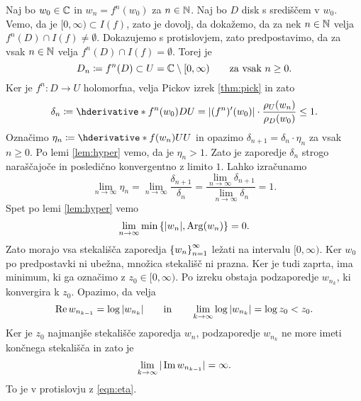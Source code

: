 \begin{dokaz}
    Naj bo \(w_0 \in \mathbb C\) in \(w_n = f^n (w_0)\) za \(n \in \mathbb N\). Naj bo \(D\) disk s središčem v \(w_0\). Vemo, da je \([0, \infty) \subset I (f)\), zato je dovolj, da dokažemo, da za nek \(n \in \mathbb N\) velja \(f^n (D) \cap I (f) \neq \emptyset\). Dokazujemo s protislovjem, zato predpostavimo, da za vsak \(n \in \mathbb N\) velja \(f^n (D) \cap I (f) = \emptyset\). Torej je
    \[D_n \coloneq f^n (D) \subset U = \mathbb C \setminus [0, \infty) \qquad \text{za vsak } n \geq 0.\]
    Ker je \(f^n \colon D \to U\) holomorfna, velja Pickov izrek \ref{thm:pick} in zato
    \[\delta_n \coloneq \hder{f^n (w_0)}{D}{U} = |(f^n)' (w_0)| \cdot \frac{\rho_U (w_n)}{\rho_D (w_0)} \leq 1.\]
    Označimo \(\eta_n \coloneq \hder{f (w_n)}{U}{U}\) in opazimo \(\delta_{n + 1} = \delta_n \cdot \eta_n\) za vsak \(n \geq 0\). Po lemi \ref{lem:hyper} vemo, da je \(\eta_n > 1\). Zato je zaporedje \(\delta_n\) strogo naraščajoče in posledično konvergentno z limito \(\num{1}\). Lahko izračunamo
    \[\lim_{n \to \infty} \eta_n = \lim_{n \to \infty} \frac{\delta_{n + 1}}{\delta_n} = \frac{\lim_{n \to \infty} \delta_{n + 1}}{\lim_{n \to \infty} \delta_n} = 1.\]
    Spet po lemi \ref{lem:hyper} vemo
    \[\lim_{n \to \infty} \min \left\{ |w_n|, \operatorname{Arg} (w_n) \right\} = 0.\]
    Zato morajo vsa stekališča zaporedja \(\left\{ w_n \right\}_{n = 1}^{\infty}\) ležati na intervalu \([0, \infty)\). Ker \(w_0\) po predpostavki ni ubežna, množica stekališč ni prazna. Ker je tudi zaprta, ima minimum, ki ga označimo z \(z_0 \in [0, \infty)\). Po izreku obstaja podzaporedje \(w_{n_{k}}\), ki konvergira k \(z_0\). Opazimo, da velja
    \[\operatorname{Re} w_{n_{k - 1}} = \log |w_{n_{k}}| \qquad \text{in} \qquad \lim_{k \to \infty} \log |w_{n_{k}}| = \log z_0 < z_0.\]
    Ker je \(z_0\) najmanjše stekališče zaporedja \(w_n\), podzaporedje \(w_{n_{k}}\) ne more imeti končnega stekališča in zato je
    \[\lim_{k \to \infty} |\operatorname{Im} w_{n_{k-1}}| = \infty.\]
    To je v protislovju z \eqref{eqn:eta}.
\end{dokaz}



